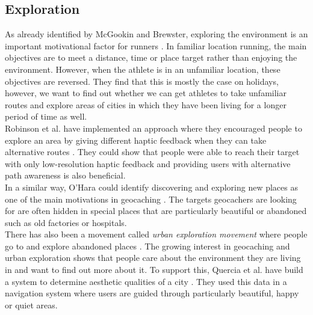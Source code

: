 \documentclass{sigchi}
\begin{document}
\subsection{Exploration}
As already identified by McGookin and Brewster, exploring the environment is an important motivational factor for runners \cite{undirectedrunnernav}. In familiar location running, the main objectives are to meet a distance, time or place target rather than enjoying the environment. However, when the athlete is in an unfamiliar location, these objectives are reversed. They find that this is mostly the case on holidays, however, we want to find out whether we can get athletes to take unfamiliar routes and explore areas of cities in which they have been living for a longer period of time as well.\\
Robinson et al. have implemented an approach where they encouraged people to explore an area by giving different haptic feedback when they can take alternative routes \cite{ididitmyway}. They could show that people were able to reach their target with only low-resolution haptic feedback and providing users with alternative path awareness is also beneficial.\\
In a similar way, O'Hara could identify discovering and exploring new places as one of the main motivations in geocaching \cite{o2008understanding}. The targets geocachers are looking for are often hidden in special places that are particularly beautiful or abandoned such as old factories or hospitals.\\
There has also been a movement called \textit{urban exploration movement} where people go to and explore abandoned places \cite{urbanexploration}. The growing interest in geocaching and urban exploration shows that people care about the environment they are living in and want to find out more about it. To support this, Quercia et al. have build a system to determine aesthetic qualities of a city \cite{aestheticslondon}. They used this data in a navigation system where users are guided through particularly beautiful, happy or quiet areas.
\end{document}
